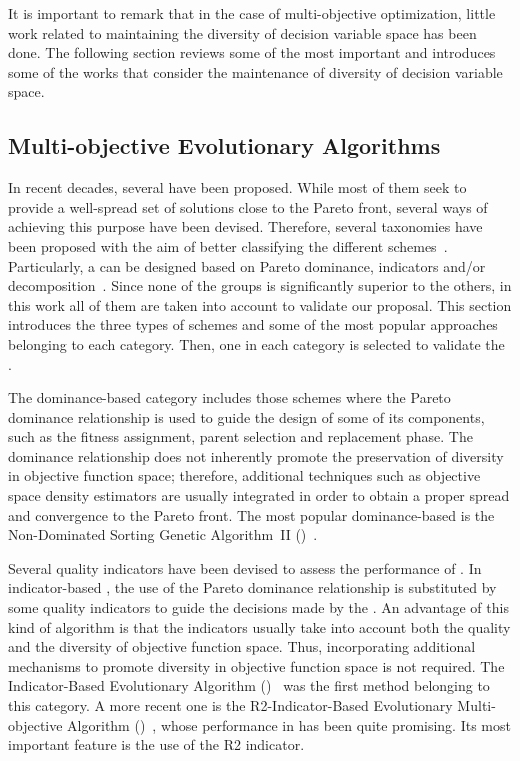 It is important to remark that in the case of multi-objective optimization, little work related to maintaining the 
diversity of decision variable space has been done.
%
The following section reviews some of the most important \MOEAS{} and introduces some of the works that consider
the maintenance of diversity of decision variable space.

\subsection{Multi-objective Evolutionary Algorithms}

In recent decades, several \MOEAS{} have been proposed. 
%
While most of them seek to provide a well-spread set of solutions close to the Pareto front,
several ways of achieving this purpose have been devised.
%
Therefore, several taxonomies have been proposed with the aim of better classifying the different 
schemes~\cite{Joel:BOOK_MOEAs}.
%
Particularly, a \MOEA{} can be designed based on Pareto dominance, indicators and/or decomposition~\cite{Joel:StateArt}.
%
Since none of the groups is significantly superior to the others, in this work all of them are taken into account to validate
our proposal.
%
This section introduces the three types of schemes and some of the most popular approaches belonging to each category.
%
Then, one \MOEA{} in each category is selected to validate the \VSDMOEA{}.

The dominance-based category includes those schemes where the Pareto dominance relationship is used to guide the 
design of some of its components, such as the fitness assignment, parent selection and replacement phase.
%
The dominance relationship does not inherently promote the preservation of diversity in objective function space; 
therefore, additional techniques such as objective space density estimators are usually integrated in order to obtain 
a proper spread and convergence to the Pareto front.
%
The most popular dominance-based \MOEA{} is the Non-Dominated Sorting Genetic Algorithm~II (\NSGAII{})~\cite{Joel:NSGAII}.
%

Several quality indicators have been devised to assess the performance of \MOEAS{}.
%
In indicator-based \MOEAS{}, the use of the Pareto dominance relationship is substituted by some quality indicators 
to guide the decisions made by the \MOEA{}.
%
An advantage of this kind of algorithm is that the indicators usually take into account both the quality and 
the diversity of objective function space. Thus, incorporating additional mechanisms to promote diversity in 
objective function space is not required.
%
The Indicator-Based Evolutionary Algorithm (\IBEA{})~\cite{Joel:IBEA} was the first method belonging to this category.
%
A more recent one is the R2-Indicator-Based Evolutionary Multi-objective Algorithm (\RMOEA{})~\cite{trautmann2013r2}, 
whose performance in \MOPS{} has been quite promising.
%
Its most important feature is the use of the R2 indicator.

